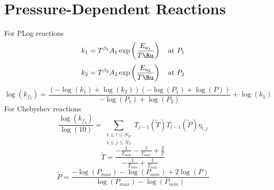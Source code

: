 \documentclass[a4paper,10pt]{article}
\begin{document}
\section{Pressure-Dependent Reactions}
For PLog reactions
\begin{dmath} k_{1}=T^{\beta_1} A_{1} \operatorname{exp}\left({\frac{E_{a_1}}{T \Ru}}\right)\text{\quad at $P_1$}\end{dmath} 
\begin{dmath} k_{2}=T^{\beta_2} A_{2} \operatorname{exp}\left({\frac{E_{a_2}}{T \Ru}}\right)\text{\quad at $P_2$}\end{dmath} 
\begin{dmath} \log{\left ({k_f}_{i} \right )} = \frac{\left(- \log{\left (k_{1} \right )} + \log{\left (k_{2} \right )}\right) \left(- \log{\left (P_{1} \right )} + \log{\left (P \right )}\right)}{- \log{\left (P_{1} \right )} + \log{\left (P_{2} \right )}} + \log{\left (k_{1} \right )}\end{dmath} 
For Chebyshev reactions
\begin{dmath} \frac{\log{\left ({k_f}_{i} \right )}}{\log{\left (10 \right )}} = \sum_{\substack{1 \leq l \leq N_{P}\\1 \leq j \leq N_{T}}} T_{j - 1}\left(\tilde{T}\right) T_{l - 1}\left(\tilde{P}\right) \eta_{l,j}\end{dmath} 
\begin{dmath} \tilde{T} = \frac{- \frac{1}{T_{min}} - \frac{1}{T_{max}} + \frac{2}{T}}{- \frac{1}{T_{min}} + \frac{1}{T_{max}}}\end{dmath} 
\begin{dmath} \tilde{P} = \frac{- \log{\left (P_{max} \right )} - \log{\left (P_{min} \right )} + 2 \log{\left (P \right )}}{\log{\left (P_{max} \right )} - \log{\left (P_{min} \right )}}\end{dmath} 
\end{document}

